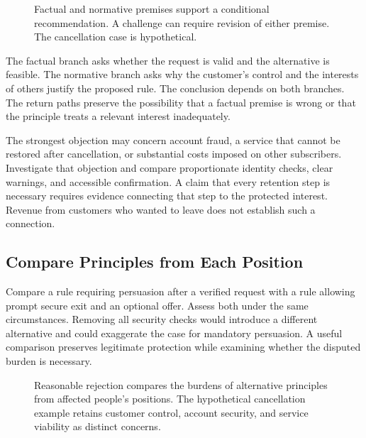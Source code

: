 \begin{figure}[htbp]
\centering

\caption{Factual and normative premises support a conditional recommendation. A challenge can require revision of either premise. The cancellation case is hypothetical.}\label{fig:M09_argument_premises}
\end{figure}

The factual branch asks whether the request is valid and the alternative
is feasible. The normative branch asks why the customer's control and
the interests of others justify the proposed rule. The conclusion
depends on both branches. The return paths preserve the possibility that
a factual premise is wrong or that the principle treats a relevant
interest inadequately.

The strongest objection may concern account fraud, a service that cannot
be restored after cancellation, or substantial costs imposed on other
subscribers. Investigate that objection and compare proportionate
identity checks, clear warnings, and accessible confirmation. A claim
that every retention step is necessary requires evidence connecting that
step to the protected interest. Revenue from customers who wanted to
leave does not establish such a connection.

\hypertarget{M09-compare-principles-from-each-position}{%
\subsection{Compare Principles from Each
Position}\label{M09-compare-principles-from-each-position}}

\noindent \noindent Compare a rule requiring persuasion after a verified request
with a rule allowing prompt secure exit and an optional offer. Assess
both under the same circumstances. Removing all security checks would
introduce a different alternative and could exaggerate the case for
mandatory persuasion. A useful comparison preserves legitimate
protection while examining whether the disputed burden is necessary.

\begin{figure}[htbp]
\centering

\caption{Reasonable rejection compares the burdens of alternative principles from affected people’s positions. The hypothetical cancellation example retains customer control, account security, and service viability as distinct concerns.}\label{fig:M09_reasonable_rejection}
\end{figure}

